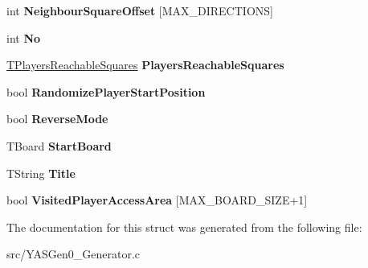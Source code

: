 \begin{DoxyCompactItemize}
\mbox{\label{struct_t_game_ab9a9dcd8a8cbe1fcacce80c0fbd94354}} 
int {\bfseries Neighbour\+Square\+Offset} \mbox{[}M\+A\+X\+\_\+\+D\+I\+R\+E\+C\+T\+I\+O\+NS\mbox{]}
\item 
\mbox{\label{struct_t_game_ace254e9fb3159665c43bd42a66510b8e}} 
int {\bfseries No}
\item 
\mbox{\label{struct_t_game_a7f9a288977931def6647113cebfe16b8}} 
\hyperlink{struct_t_players_reachable_squares}{T\+Players\+Reachable\+Squares} {\bfseries Players\+Reachable\+Squares}
\item 
\mbox{\label{struct_t_game_af7e8c6a4f5eecd10ca923595885bf83a}} 
bool {\bfseries Randomize\+Player\+Start\+Position}
\item 
\mbox{\label{struct_t_game_abf9858df71783b5b161ed395d6b00905}} 
bool {\bfseries Reverse\+Mode}
\item 
\mbox{\label{struct_t_game_a95a296309e01b1b05d8077b95cf19a13}} 
T\+Board {\bfseries Start\+Board}
\item 
\mbox{\label{struct_t_game_a519bc5b0db0901b11d6fcffea60c285d}} 
T\+String {\bfseries Title}
\item 
\mbox{\label{struct_t_game_adc9e38b07695a517b9e5d6d582a5f0d4}} 
bool {\bfseries Visited\+Player\+Access\+Area} \mbox{[}M\+A\+X\+\_\+\+B\+O\+A\+R\+D\+\_\+\+S\+I\+ZE+1\mbox{]}
\end{DoxyCompactItemize}


The documentation for this struct was generated from the following file\+:\begin{DoxyCompactItemize}
\item 
src/Y\+A\+S\+Gen0\+\_\+\+Generator.\+c\end{DoxyCompactItemize}
